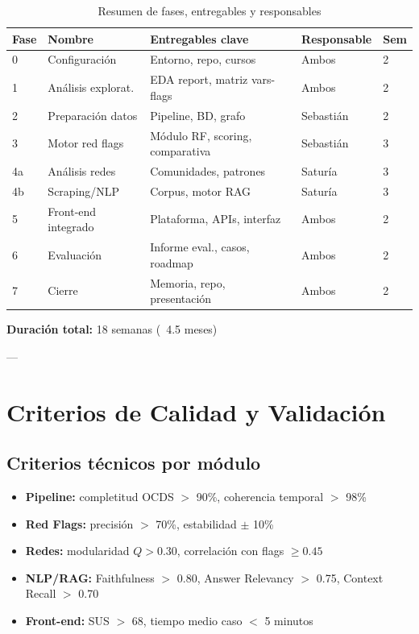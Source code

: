 \documentclass[11pt,a4paper,spanish]{book}
\numberwithin{equation}{chapter}
\numberwithin{figure}{chapter}
\begin{document}
\begin{table}[h]
\centering
\caption{Resumen de fases, entregables y responsables}
\label{tab:fases_entregables}
\begin{tabular}{|p{0.8cm}|p{1.5cm}|p{3cm}|p{1.5cm}|p{1cm}|}
\hline
\textbf{Fase} & \textbf{Nombre} & \textbf{Entregables clave} & \textbf{Responsable} & \textbf{Sem} \\
\hline
0 & Configuración & Entorno, repo, cursos & Ambos & 2 \\
\hline
1 & Análisis explorat. & EDA report, matriz vars-flags & Ambos & 2 \\
\hline
2 & Preparación datos & Pipeline, BD, grafo & Sebastián & 2 \\
\hline
3 & Motor red flags & Módulo RF, scoring, comparativa & Sebastián & 3 \\
\hline
4a & Análisis redes & Comunidades, patrones & Saturía & 3 \\
\hline
4b & Scraping/NLP & Corpus, motor RAG & Saturía & 3 \\
\hline
5 & Front-end integrado & Plataforma, APIs, interfaz & Ambos & 2 \\
\hline
6 & Evaluación & Informe eval., casos, roadmap & Ambos & 2 \\
\hline
7 & Cierre & Memoria, repo, presentación & Ambos & 2 \\
\hline
\end{tabular}
\end{table}

\textbf{Duración total:} 18 semanas (~4.5 meses)

---

\section{Criterios de Calidad y Validación}

\subsection{Criterios técnicos por módulo}

\begin{itemize}
\item \textbf{Pipeline:} completitud OCDS $>$ 90\%, coherencia temporal $>$ 98\%
\item \textbf{Red Flags:} precisión $>$ 70\%, estabilidad $\pm$ 10\%
\item \textbf{Redes:} modularidad $Q > 0.30$, correlación con flags $\geq 0.45$
\item \textbf{NLP/RAG:} Faithfulness $>$ 0.80, Answer Relevancy $>$ 0.75, Context Recall $>$ 0.70
\item \textbf{Front-end:} SUS $>$ 68, tiempo medio caso $<$ 5 minutos
\end{itemize}
\end{document}
